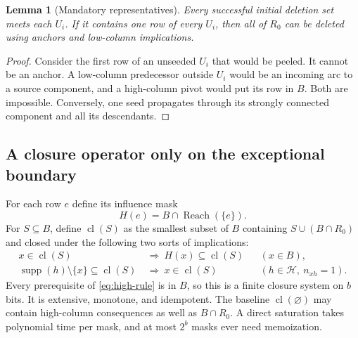 \documentclass[11pt,letterpaper]{article}
\newtheorem{lemma}[theorem]{Lemma}
\theoremstyle{definition}
\newcommand{\Reach}{\operatorname{Reach}}
\newcommand{\cl}{\operatorname{cl}}
\newcommand{\supp}{\operatorname{supp}}
\begin{document}
\begin{lemma}[Mandatory representatives]\label{lem:mandatory}
Every successful initial deletion set meets each $U_i$. If it contains one
row of every $U_i$, then all of $R_0$ can be deleted using anchors and
low-column implications.
\end{lemma}
\begin{proof}
Consider the first row of an unseeded $U_i$ that would be peeled. It cannot
be an anchor. A low-column predecessor outside $U_i$ would be an incoming
arc to a source component, and a high-column pivot would put its row in $B$.
Both are impossible. Conversely, one seed propagates through its strongly
connected component and all its descendants.
\end{proof}

\subsection{A closure operator only on the exceptional boundary}
For each row $e$ define its influence mask
\[
 H(e)=B\cap\Reach(\{e\}).
\]
For $S\subseteq B$, define $\cl(S)$ as the smallest subset of $B$ containing
$S\cup(B\cap R_0)$ and closed under the following two sorts of implications:
\begin{align}
 x\in\cl(S)&\ \Longrightarrow\ H(x)\subseteq\cl(S)
                  &&(x\in B),\label{eq:low-rule}\\
 \supp(h)\setminus\{x\}\subseteq\cl(S)
       &\ \Longrightarrow\ x\in\cl(S)
                  &&(h\in\mathcal H,\ n_{xh}=1).\label{eq:high-rule}
\end{align}
Every prerequisite of \eqref{eq:high-rule} is in $B$, so this is a finite
closure system on $b$ bits. It is extensive, monotone, and idempotent. The
baseline $\cl(\varnothing)$ may contain high-column consequences as well
as $B\cap R_0$. A direct saturation takes polynomial time per mask, and
at most $2^b$ masks ever need memoization.
\end{document}
